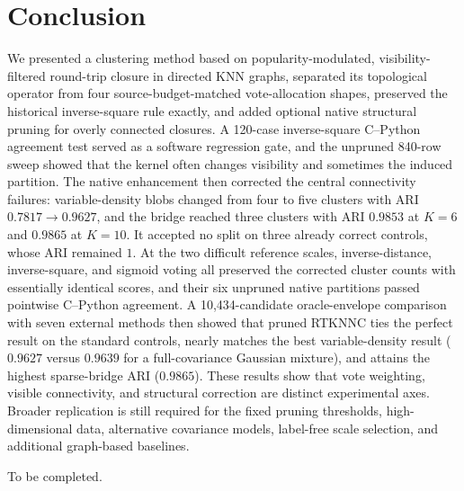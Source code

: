 \documentclass[pdflatex,sn-mathphys-num]{sn-jnl}
\begin{document}
\section{Conclusion}\label{sec:conclusion}

We presented a clustering method based on popularity-modulated,
visibility-filtered round-trip closure in directed KNN graphs, separated its
topological operator from four source-budget-matched vote-allocation shapes,
preserved the historical inverse-square rule exactly, and added optional native
structural pruning for overly connected closures.  A 120-case inverse-square
C--Python agreement test served as a software regression gate, and the
unpruned 840-row sweep showed that the kernel often changes visibility and
sometimes the induced partition.  The native enhancement then corrected the
central connectivity failures: variable-density blobs changed from four to
five clusters with ARI $0.7817\to0.9627$, and the bridge reached three clusters
with ARI $0.9853$ at $K=6$ and $0.9865$ at $K=10$.  It accepted no split on
three already correct controls, whose ARI remained $1$.  At the two difficult
reference scales, inverse-distance, inverse-square, and sigmoid voting all
preserved the corrected cluster counts with essentially identical scores, and
their six unpruned native partitions passed pointwise C--Python agreement.
A 10,434-candidate oracle-envelope comparison with seven external methods then
showed that pruned RTKNNC ties the perfect result on the standard controls,
nearly matches the best variable-density result ($0.9627$ versus $0.9639$ for
a full-covariance Gaussian mixture), and attains the highest sparse-bridge ARI
($0.9865$).  These results show that vote weighting, visible connectivity, and
structural correction are distinct experimental axes.  Broader replication is
still required for the fixed pruning thresholds, high-dimensional data,
alternative covariance models, label-free scale selection, and additional
graph-based baselines.

\backmatter

To be completed.
\end{document}
